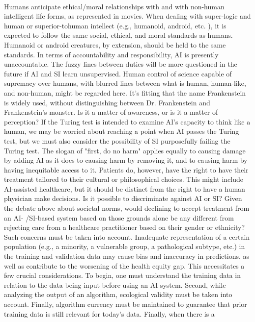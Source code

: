 \documentclass[12pt]{article}
\begin{document}
\\ Humans anticipate ethical/moral relationships with and with non-human intelligent life forms, as represented in
movies. When dealing with super-logic and human or superior-tohuman intellect (e.g., humanoid, android, etc. ),
it is expected to follow the same social, ethical, and moral standards as humans. Humanoid or android creatures, by extension, should be held to the same standards. In terms of accountability and responsibility, AI is presently
unaccountable. The fuzzy lines between duties will be more questioned in the future if AI and SI learn
unsupervised. Human control of science capable of supremacy over humans, with blurred lines between what is
human, human-like, and non-human, might be regarded here. It's fitting that the name Frankenstein is widely
used, without distinguishing between Dr. Frankenstein and Frankenstein's monster. Is it a matter of awareness, or is it a matter of perception? If the Turing test is intended to examine AI's capacity to think like a human, we
may be worried about reaching a point when AI passes the Turing test, but we must also consider the possibility
of SI purposefully failing the Turing test. The slogan of "first, do no harm" applies equally to causing damage by adding AI as it does to causing harm by
removing it, and to causing harm by having inequitable access to it. Patients do, however, have the right to have
their treatment tailored to their cultural or philosophical choices. This might include AI-assisted healthcare, but
it should be distinct from the right to have a human physician make decisions. Is it possible to discriminate
against AI or SI? Given the debate above about societal norms, would declining to accept treatment from an AI- /SI-based system based on those grounds alone be any different from rejecting care from a healthcare
practitioner based on their gender or ethnicity? Such concerns must be taken into account.
Inadequate representation of a certain population (e.g., a minority, a vulnerable group, a pathological subtype, etc.) in the training and validation data may cause bias and inaccuracy in predictions, as well as contribute to
the worsening of the health equity gap. This necessitates a few crucial considerations. To begin, one must
understand the training data in relation to the data being input before using an AI system. Second, while
analyzing the output of an algorithm, ecological validity must be taken into account. Finally, algorithm currency
must be maintained to guarantee that prior training data is still relevant for today's data. Finally, when there is a
\end{document}

